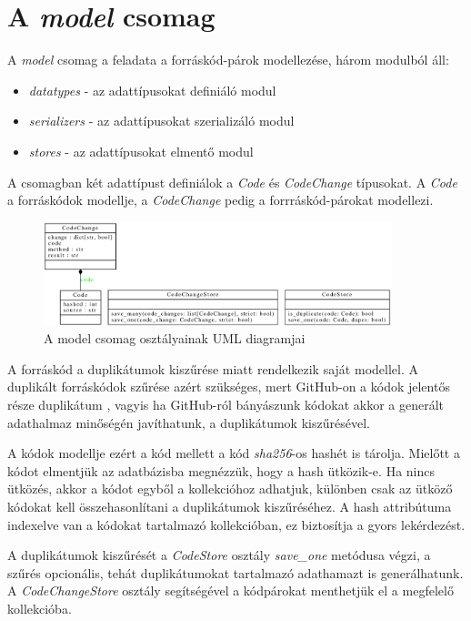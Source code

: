\section{A \emph{model} csomag}

A \emph{model} csomag a feladata a forráskód-párok modellezése, három modulból áll:

\begin{itemize}
	\item \emph{datatypes} - az adattípusokat definiáló modul
	\item \emph{serializers} - az adattípusokat szerializáló modul
	\item \emph{stores} - az adattípusokat elmentő modul
\end{itemize}

A csomagban két adattípust definiálok a \emph{Code} és \emph{CodeChange} típusokat.
A \emph{Code} a forráskódok modellje, a \emph{CodeChange} pedig a forrráskód-párokat modellezi.

\begin{figure}[H]
	\centering
	\includegraphics[width=0.9\textwidth]{images/uml/models.eps}
	\caption{A model csomag osztályainak UML diagramjai}
\end{figure}

A forráskód a duplikátumok kiszűrése miatt rendelkezik saját modellel.
A duplikált forráskódok szűrése azért szükséges, mert GitHub-on a kódok jelentős része duplikátum
\cite{GitHubDuplication},
vagyis ha GitHub-ról bányászunk kódokat akkor a generált adathalmaz minőségén javíthatunk,
a duplikátumok kiszűrésével.

A kódok modellje ezért a kód mellett a kód \emph{sha256}-os hashét is tárolja.
Mielőtt a kódot elmentjük az adatbázisba megnézzük, hogy a hash ütközik-e.
Ha nincs ütközés, akkor a kódot egyből a kollekcióhoz adhatjuk,
különben csak az ütköző kódokat kell összehasonlítani a duplikátumok kiszűréséhez.
A hash attribútuma indexelve van a kódokat tartalmazó kollekcióban,
ez biztosítja a gyors lekérdezést.

A duplikátumok kiszűrését a \emph{CodeStore} osztály \emph{save\_one} metódusa végzi,
a szűrés opcionális, tehát duplikátumokat tartalmazó adathamazt is generálhatunk.
A \emph{CodeChangeStore} osztály segítségével a kódpárokat menthetjük el a megfelelő kollekcióba.


